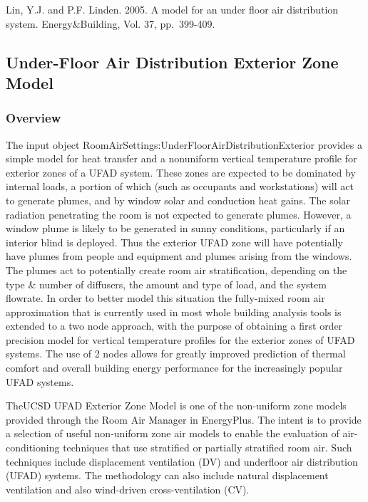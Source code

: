 Lin, Y.J. and P.F. Linden. 2005. A model for an under floor air distribution system. Energy\&Building, Vol. 37, pp.~399-409.

\subsection{Under-Floor Air Distribution Exterior Zone Model}\label{under-floor-air-distribution-exterior-zone-model}

\subsubsection{Overview}\label{overview-2-001}

The input object RoomAirSettings:UnderFloorAirDistributionExterior provides a simple model for heat transfer and a nonuniform vertical temperature profile for exterior zones of a UFAD system. These zones are expected to be dominated by internal loads, a portion of which (such as occupants and workstations) will act to generate plumes, and by window solar and conduction heat gains. The solar radiation penetrating the room is not expected to generate plumes. However, a window plume is likely to be generated in sunny conditions, particularly if an interior blind is deployed. Thus the exterior UFAD zone will have potentially have plumes from people and equipment and plumes arising from the windows. The plumes act to potentially create room air stratification, depending on the type \& number of diffusers, the amount and type of load, and the system flowrate. In order to better model this situation the fully-mixed room air approximation that is currently used in most whole building analysis tools is extended to a two node approach, with the purpose of obtaining a first order precision model for vertical temperature profiles for the exterior zones of UFAD systems. The use of 2 nodes allows for greatly improved prediction of thermal comfort and overall building energy performance for the increasingly popular UFAD systems.

TheUCSD UFAD Exterior Zone Model is one of the non-uniform zone models provided through the Room Air Manager in EnergyPlus. The intent is to provide a selection of useful non-uniform zone air models to enable the evaluation of air-conditioning techniques that use stratified or partially stratified room air. Such techniques include displacement ventilation (DV) and underfloor air distribution (UFAD) systems. The methodology can also include natural displacement ventilation and also wind-driven cross-ventilation (CV).

